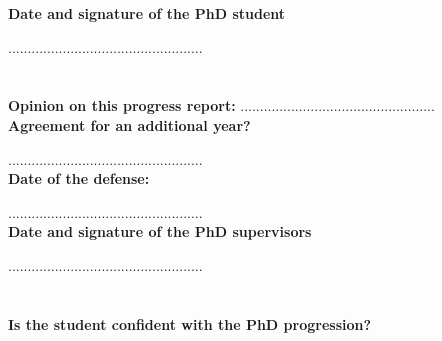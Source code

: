 \documentclass[12pt]{article}
\newcommand{\commentaire}[1]{}
\begin{document}
\noindent\textbf{Date and signature of the PhD student}

..................................................


\newpage
\section*{}

\noindent\textbf{Opinion on this progress report:}
..................................................
\\

\noindent\textbf{Agreement for an additional year?}
\commentaire{%
  Yes/No (if No, please justify)\\}
..................................................
\\

\noindent\textbf{Date of the defense:}
\commentaire{%
  this can be an approximation\\}
..................................................
\\


\noindent\textbf{Date and signature of the PhD supervisors}

..................................................

\newpage
\section*{}

\commentaire{%
  \textcolor{red}{The questions below are suggestions. For each
    section, the report can be as short as “Yes” or more detailed
    according to the feeling of the CSI.\\}}

\noindent\textbf{Is the student confident with the PhD progression?}
\commentaire{%
  E.g.: How does the PhD student view the progress of
  her/his thesis? How often does the student meet with her/his
  supervisors? How is the student’s relationship with her/his
  supervisors? In case of problems, does the student know who to
  discuss these issues with?\\}
\end{document}
